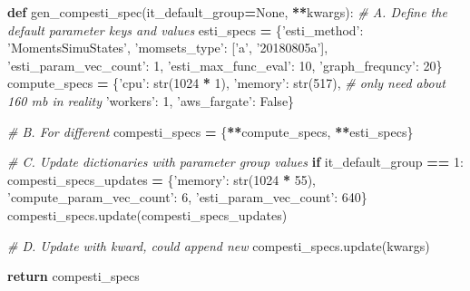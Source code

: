 \documentclass[
]{book}
\newenvironment{Shaded}{\begin{snugshade}}{\end{snugshade}}
\newcommand{\BuiltInTok}[1]{#1}
\newcommand{\CommentTok}[1]{\textcolor[rgb]{0.56,0.35,0.01}{\textit{#1}}}
\newcommand{\ControlFlowTok}[1]{\textcolor[rgb]{0.13,0.29,0.53}{\textbf{#1}}}
\newcommand{\DecValTok}[1]{\textcolor[rgb]{0.00,0.00,0.81}{#1}}
\newcommand{\KeywordTok}[1]{\textcolor[rgb]{0.13,0.29,0.53}{\textbf{#1}}}
\newcommand{\NormalTok}[1]{#1}
\newcommand{\OperatorTok}[1]{\textcolor[rgb]{0.81,0.36,0.00}{\textbf{#1}}}
\newcommand{\StringTok}[1]{\textcolor[rgb]{0.31,0.60,0.02}{#1}}
\newcommand{\VariableTok}[1]{\textcolor[rgb]{0.00,0.00,0.00}{#1}}
\begin{document}
\begin{Shaded}
\begin{Highlighting}[]
\KeywordTok{def}\NormalTok{ gen_compesti_spec(it_default_group}\OperatorTok{=}\VariableTok{None}\NormalTok{, }\OperatorTok{**}\NormalTok{kwargs):}
    \CommentTok{# A. Define the default parameter keys and values}
\NormalTok{    esti_specs }\OperatorTok{=}\NormalTok{ \{}\StringTok{'esti_method'}\NormalTok{: }\StringTok{'MomentsSimuStates'}\NormalTok{,}
                  \StringTok{'momsets_type'}\NormalTok{: [}\StringTok{'a'}\NormalTok{, }\StringTok{'20180805a'}\NormalTok{],}
                  \StringTok{'esti_param_vec_count'}\NormalTok{: }\DecValTok{1}\NormalTok{,}
                  \StringTok{'esti_max_func_eval'}\NormalTok{: }\DecValTok{10}\NormalTok{,}
                  \StringTok{'graph_frequncy'}\NormalTok{: }\DecValTok{20}\NormalTok{\}}
\NormalTok{    compute_specs }\OperatorTok{=}\NormalTok{ \{}\StringTok{'cpu'}\NormalTok{: }\BuiltInTok{str}\NormalTok{(}\DecValTok{1024} \OperatorTok{*} \DecValTok{1}\NormalTok{),}
                     \StringTok{'memory'}\NormalTok{: }\BuiltInTok{str}\NormalTok{(}\DecValTok{517}\NormalTok{),  }\CommentTok{# only need about 160 mb in reality}
                     \StringTok{'workers'}\NormalTok{: }\DecValTok{1}\NormalTok{,}
                     \StringTok{'aws_fargate'}\NormalTok{: }\VariableTok{False}\NormalTok{\}}

    \CommentTok{# B. For different}
\NormalTok{    compesti_specs }\OperatorTok{=}\NormalTok{ \{}\OperatorTok{**}\NormalTok{compute_specs, }\OperatorTok{**}\NormalTok{esti_specs\}}

    \CommentTok{# C. Update dictionaries with parameter group values}
    \ControlFlowTok{if}\NormalTok{ it_default_group }\OperatorTok{==} \DecValTok{1}\NormalTok{:}
\NormalTok{        compesti_specs_updates }\OperatorTok{=}\NormalTok{ \{}\StringTok{'memory'}\NormalTok{: }\BuiltInTok{str}\NormalTok{(}\DecValTok{1024} \OperatorTok{*} \DecValTok{55}\NormalTok{),}
                                  \StringTok{'compute_param_vec_count'}\NormalTok{: }\DecValTok{6}\NormalTok{,}
                                  \StringTok{'esti_param_vec_count'}\NormalTok{: }\DecValTok{640}\NormalTok{\}}
\NormalTok{        compesti_specs.update(compesti_specs_updates)}

    \CommentTok{# D. Update with kward, could append new}
\NormalTok{    compesti_specs.update(kwargs)}

    \ControlFlowTok{return}\NormalTok{ compesti_specs}
\end{Highlighting}
\end{Shaded}
\end{document}
